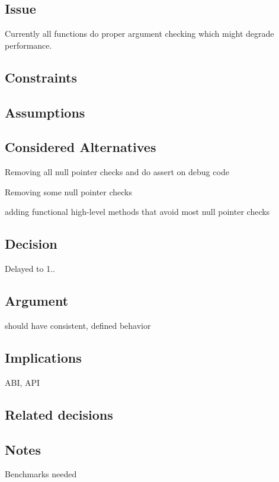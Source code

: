 \subsection*{Issue}

Currently all functions do proper argument checking which might degrade performance.

\subsection*{Constraints}

\subsection*{Assumptions}

\subsection*{Considered Alternatives}


\begin{DoxyItemize}
\item Removing all null pointer checks and do assert on debug code
\item Removing some null pointer checks
\item adding functional high-\/level methods that avoid most null pointer checks
\end{DoxyItemize}

\subsection*{Decision}

Delayed to 1..

\subsection*{Argument}


\begin{DoxyItemize}
\item should have consistent, defined behavior
\end{DoxyItemize}

\subsection*{Implications}


\begin{DoxyItemize}
\item A\+BI, A\+PI
\end{DoxyItemize}

\subsection*{Related decisions}

\subsection*{Notes}


\begin{DoxyItemize}
\item Benchmarks needed 
\end{DoxyItemize}